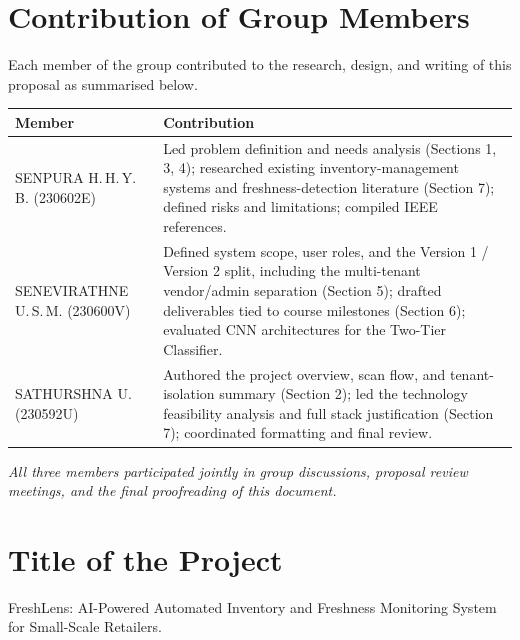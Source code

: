 \documentclass[12pt,a4paper]{article}
\begin{document}
\section*{\color{heading}Contribution of Group Members}

Each member of the group contributed to the research, design, and writing of this proposal as summarised below.

\begin{longtable}{p{3.8cm} p{9.9cm}}
    \toprule
    \rowcolor{tableheader}
    \textbf{Member} & \textbf{Contribution} \\
    \midrule
    \endhead
    SENPURA H.\,H.\,Y.\,B. \newline (230602E) &
        Led problem definition and needs analysis (Sections 1, 3, 4); researched existing inventory-management systems and freshness-detection literature (Section 7); defined risks and limitations; compiled IEEE references. \\[0.6em]
    SENEVIRATHNE U.\,S.\,M. \newline (230600V) &
        Defined system scope, user roles, and the Version 1 / Version 2 split, including the multi-tenant vendor/admin separation (Section 5); drafted deliverables tied to course milestones (Section 6); evaluated CNN architectures for the Two-Tier Classifier. \\[0.6em]
    SATHURSHNA U. \newline (230592U) &
        Authored the project overview, scan flow, and tenant-isolation summary (Section 2); led the technology feasibility analysis and full stack justification (Section 7); coordinated formatting and final review. \\
    \bottomrule
\end{longtable}

\textit{All three members participated jointly in group discussions, proposal review meetings, and the final proofreading of this document.}

\newpage

\section{Title of the Project}
FreshLens: AI-Powered Automated Inventory and Freshness Monitoring System for Small-Scale Retailers.

\end{document}

